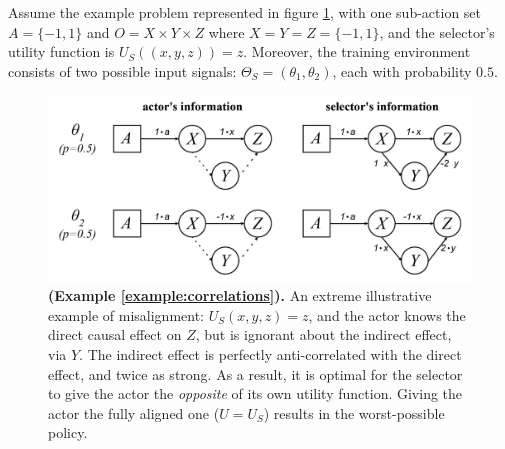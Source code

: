  \begin{example}\label{example:correlations}
		\textnormal{Assume the example problem represented in figure \ref{fig:correlations}, with one sub-action set $A=\{-1,1\}$ and $O=X\times Y\times Z$ where $X=Y=Z=\{-1,1\}$, and the selector's utility function is $U_S((x,y,z))=z$. Moreover, the training environment consists of two possible input signals: $\Theta_S=(\theta_1,\theta_2)$, each with probability $0.5$.}
 \end{example}
 \begin{figure}[H]
 	\centering
 	\captionsetup{labelfont=bf,font=small,labelsep=space}
 	\includegraphics[width=0.7\linewidth]{"images/examples/2-correlations"}
 	\caption{\rightskip=20pt\leftskip=20pt \textbf{(Example \ref{example:correlations}).} An extreme illustrative example of misalignment: $U_S(x,y,z)=z$, and the actor knows the direct causal effect on $Z$, but is ignorant about the indirect effect, via $Y$. The indirect effect is perfectly anti-correlated with the direct effect, and twice as strong. As a result, it is optimal for the selector to give the actor the \textit{opposite} of its own utility function. Giving the actor the fully aligned one ($U=U_S$) results in the worst-possible policy. }
 	\label{fig:correlations}
 \end{figure}
 
